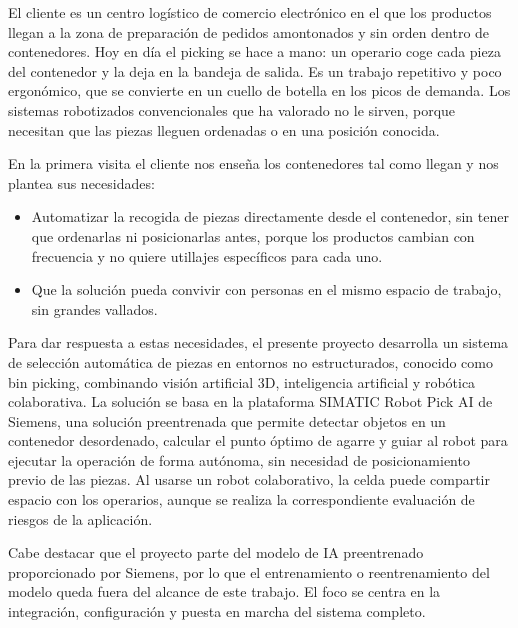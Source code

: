 El cliente es un centro logístico de comercio electrónico en el que los productos llegan a la zona de preparación
de pedidos amontonados y sin orden dentro de contenedores. Hoy en día el picking se hace a mano: un operario coge
cada pieza del contenedor y la deja en la bandeja de salida. Es un trabajo repetitivo y poco ergonómico, que se
convierte en un cuello de botella en los picos de demanda. Los sistemas robotizados convencionales que ha
valorado no le sirven, porque necesitan que las piezas lleguen ordenadas o en una posición conocida.

En la primera visita el cliente nos enseña los contenedores tal como llegan y nos plantea sus necesidades:
\begin{itemize}
	\item Automatizar la recogida de piezas directamente desde el contenedor, sin tener que ordenarlas ni
	      posicionarlas antes, porque los productos cambian con frecuencia y no quiere utillajes específicos
	      para cada uno.
	\item Que la solución pueda convivir con personas en el mismo espacio de trabajo, sin grandes vallados.
\end{itemize}

Para dar respuesta a estas necesidades, el presente proyecto desarrolla un sistema de selección automática de piezas
en entornos no estructurados, conocido como bin picking, combinando visión artificial 3D, inteligencia
artificial y robótica colaborativa. La solución se basa en la plataforma SIMATIC Robot Pick AI de Siemens,
una solución preentrenada que permite detectar objetos en un contenedor desordenado, calcular el punto óptimo
de agarre y guiar al robot para ejecutar la operación de forma autónoma, sin necesidad de posicionamiento
previo de las piezas. Al usarse un robot colaborativo, la celda puede compartir espacio con los operarios,
aunque se realiza la correspondiente evaluación de riesgos de la aplicación.

Cabe destacar que el proyecto parte del modelo de IA preentrenado proporcionado por Siemens, por lo que
el entrenamiento o reentrenamiento del modelo queda fuera del alcance de este trabajo. El foco se centra
en la integración, configuración y puesta en marcha del sistema completo.
